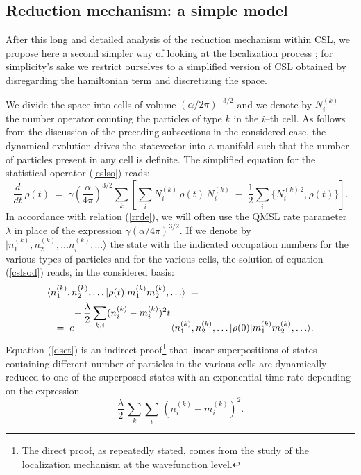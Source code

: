 \documentclass[10pt,a4paper]{article}
\begin{document}
\subsection{Reduction mechanism: a simple model} \label{sec75}


After this long and detailed analysis of the reduction mechanism
within CSL, we propose here a second simpler way of looking at
the localization process \cite{cc}; for simplicity's  sake we
restrict ourselves to a simplified version of CSL obtained by
disregarding the hamiltonian term and discretizing the space.

We divide the space into cells of volume $(\alpha/2\pi)^{-3/2}$
and we denote by $N_{i}^{(k)}$ the number operator counting the
particles of type $k$ in the $i$--th cell. As follows from the
discussion of the preceding subsections in the considered case,
the dynamical evolution drives the statevector into a manifold
such that the number of particles present in any cell is definite.
The simplified equation for the statistical operator (\ref{cslso})
reads:
\begin{equation} \label{cslsod}
\frac{d}{dt}\, \rho(t) \; = \;
\gamma\left(\frac{\alpha}{4\pi}\right)^{3/2} \sum_{k} \left[
\sum_{i} N_{i}^{(k)}\, \rho(t)\, N_{i}^{(k)} \; - \;
\frac{1}{2}\sum_{i} \{ N_{i}^{(k)\,2} , \rho(t) \} \right].
\end{equation}
In accordance with relation (\ref{rrde}), we will often use the
QMSL rate parameter $\lambda$ in place of the expression $\gamma
(\alpha/4\pi)^{3/2}$. If we denote by $|n_{1}^{(k)}, n_{2}^{(k)},
\ldots n_{i}^{(k)}, \ldots \rangle$ the state with the indicated
occupation numbers for the various types of particles and for the
various cells, the solution of equation (\ref{cslsod}) reads, in
the considered basis:
\begin{eqnarray} \label{dsct}
\lefteqn{ \langle n_{1}^{(k)}, n_{2}^{(k)},\ldots |\rho(t)|
m_{1}^{(k)} m_{2}^{(k)},\ldots\rangle \; = \;} \nonumber \\ & &
=\; e^{\displaystyle -\, \frac{\lambda}{2}\sum_{k,i} (n_{i}^{(k)}
- m_{i}^{(k)})^{2}t} \langle n_{1}^{(k)}, n_{2}^{(k)},\ldots
|\rho(0)| m_{1}^{(k)} m_{2}^{(k)},\ldots\rangle.
\end{eqnarray}
Equation (\ref{dsct}) is an indirect proof\footnote{The direct
proof, as repeatedly stated, comes from the study of the
localization mechanism at the wavefunction level.} that linear
superpositions of states containing different number of particles
in the various cells are dynamically reduced to one of the
superposed states with an exponential time rate depending on the
expression
\[
\frac{\lambda}{2}\, \sum_{k} \sum_{i}\, (n_{i}^{(k)} -
m_{i}^{(k)})^{2}.
\]
\end{document}
